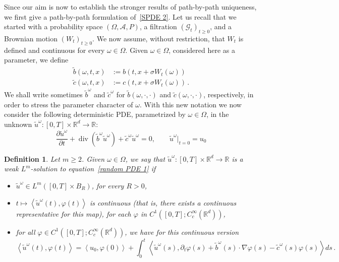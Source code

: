 \documentclass[a4paper,10pt]{article}
\newtheorem{definition}[theorem]{Definition}
\begin{document}
Since our aim is now to establish the stronger results of path-by-path uniqueness, we first
give a path-by-path formulation of~\eqref{SPDE 2}. Let us recall that we
started with a probability space $(\Omega,\mathcal{A},P)$, a
filtration $(\mathcal{G}_{t})_{t\geq0}$, and a Brownian motion
$(W_{t})_{t\geq0}$. We now assume, without restriction, that
$W_{t}$ is defined and continuous for every $\omega\in\Omega$. Given
$\omega\in\Omega$, considered here as a parameter, we define
\begin{align*}
\widetilde{b}(\omega,t,x) &  :=b(t,x+\sigma W_{t}(\omega)) \\
\widetilde{c}(\omega,t,x) &  :=c(t,x+\sigma W_{t}(\omega)) \, .
\end{align*}
We shall write sometimes $\widetilde{b}^{\omega}$ and $\widetilde{c}^{\omega}$
for $\widetilde{b}(\omega,\cdot,\cdot)$ and $\widetilde{c}(\omega,\cdot,\cdot)$, respectively, in order to stress the parameter character of $\omega$. With this new notation we now consider the following deterministic PDE, parametrized by $\omega\in\Omega$, in
the unknown $\widetilde{u}^{\omega} \colon [0,T]\times\mathbb{R}^{d}\rightarrow\mathbb{R}$:
\begin{equation}
\frac{\partial\widetilde{u}^{\omega}}{\partial t}+\operatorname{div}(
\widetilde{b}^{\omega}\widetilde{u}^{\omega})  +\widetilde{c}^{\omega
}\widetilde{u}^{\omega}=0,\qquad\widetilde{u}^{\omega}|_{t=0}=u_{0}
\label{random PDE 1}
\end{equation}

\begin{definition}
\label{Def weak sol random PDE}
Let $m\geq2$. Given $\omega\in\Omega$, we say that $\widetilde{u}^{\omega} \colon [0,T]
\times\mathbb{R}^{d}\rightarrow\mathbb{R}$ is a weak $L^{m}$-solution to
equation~\eqref{random PDE 1} if

\begin{itemize}
\item $\widetilde{u}^{\omega}\in L^{m}([0,T]  \times
B_{R})$, for every $R>0$,

\item $t\mapsto\left\langle \widetilde{u}^{\omega}(t)
,\varphi(t)\right\rangle $ is continuous (that is, there exists a continuous representative for this map), for each $\varphi$ in $C^1([0,T];C_{c}^{\infty
}(\mathbb{R}^{d}))$,

\item for all $\varphi\in C^1([0,T];C_{c}^{\infty}(\mathbb{R}^{d}))$, we have for this continuous version
\begin{equation}\label{formulation_randomPDE}
\left\langle \widetilde{u}^{\omega}(t)  ,\varphi(t)\right\rangle  
=\left\langle u_{0},\varphi(0)\right\rangle +\int^t_0\left\langle \widetilde{u}^\omega(s),\partial_t\varphi(s) + \widetilde{b}^{\omega}(
s)  \cdot\nabla\varphi(s)-\widetilde{c}^{\omega}(s)
\varphi(s) \right\rangle ds \, .
\end{equation}
\end{itemize}
\end{definition}
\end{document}
